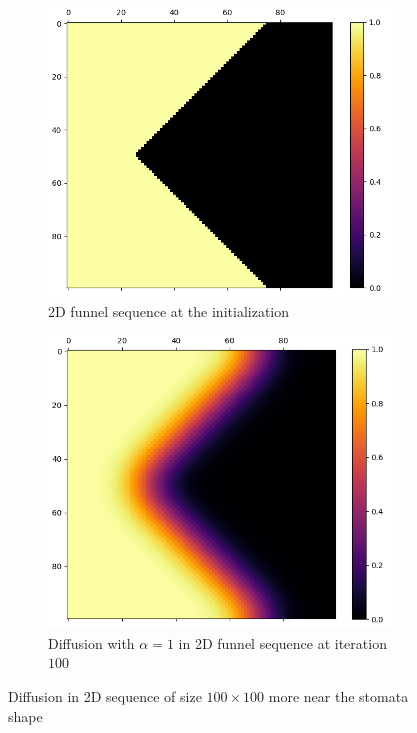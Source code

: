 \begin{figure}[ht]
    \centering
    \begin{subfigure}[b]{0.49\textwidth}
        \centering
        \includegraphics[width=\textwidth]{figures/2d_pyramid_init.png}
        \caption{2D funnel sequence at the initialization}
        \label{fig:diff_2d_fnl_init}
    \end{subfigure}
    \hfill
    \begin{subfigure}[b]{0.47\textwidth}
        \centering
        \includegraphics[width=\textwidth]{figures/2d_pyramid_100.png}
        \caption{Diffusion with $\alpha=1$ in 2D funnel sequence at iteration $100$}
        \label{fig:diff_2d_fnl_100}
    \end{subfigure}
    \caption{Diffusion in 2D sequence of size $100 \times 100$ more near the stomata shape}
    \label{fig:diff_fnl_pyr}
\end{figure}

